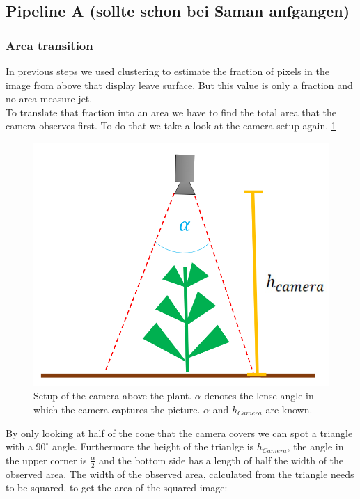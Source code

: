 \graphicspath{{members/tf/figures/}}

\subsection{Pipeline A (sollte schon bei Saman anfgangen)}

\subsubsection{Area transition}
In previous steps we used clustering to estimate the fraction of pixels in the image from above that display leave surface. But this value is only a fraction and no area measure jet.\\
To translate that fraction into an area we have to find the total area that the camera observes first. To do that we take a look at the camera setup again. \ref{fig:setupAbove}
   \begin{figure}[H]
       \centering
       \includegraphics[scale=0.6]{setupAbove.PNG}
       \caption{Setup of the camera above the plant. $\alpha$ denotes the lense angle in which the camera captures the picture. $\alpha$ and $h_{Camera}$ are known.}
       \label{fig:setupAbove}
   \end{figure}
By only looking at half of the cone that the camera covers we can spot a triangle with a $90^{\circ}$ angle. Furthermore the height of the trianlge is $h_{Camera}$, the angle in the upper corner is $\frac{\alpha}{2}$ and the bottom side has a length of half the width of the observed area. The width of the observed area, calculated from the triangle needs to be squared, to get the area of the squared image:\\
